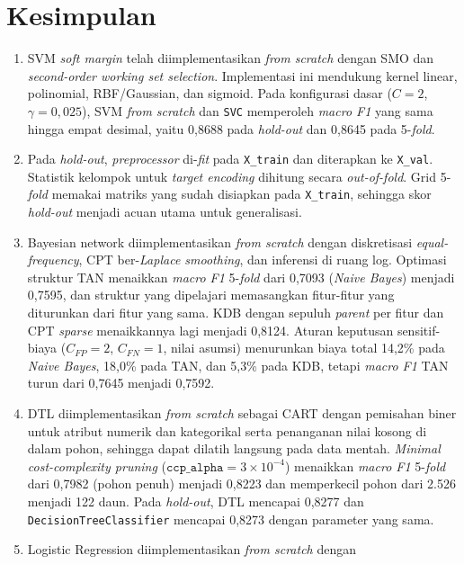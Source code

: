 \section{Kesimpulan}

\begin{enumerate}
	\item SVM \textit{soft margin} telah diimplementasikan \textit{from scratch}
	dengan SMO dan \textit{second-order working set selection}. Implementasi ini
	mendukung kernel linear, polinomial, RBF/Gaussian, dan sigmoid. Pada
	konfigurasi dasar ($C=2$, $\gamma=0{,}025$), SVM \textit{from scratch} dan
	\texttt{SVC} memperoleh \textit{macro F1} yang sama hingga empat desimal,
	yaitu 0,8688 pada \textit{hold-out} dan 0,8645 pada 5-\textit{fold}.
	\item Pada \textit{hold-out}, \textit{preprocessor} di-\textit{fit} pada
	\texttt{X\_train} dan diterapkan ke \texttt{X\_val}. Statistik kelompok
	untuk \textit{target encoding} dihitung secara \textit{out-of-fold}.
	Grid 5-\textit{fold} memakai matriks yang sudah disiapkan pada
	\texttt{X\_train}, sehingga skor \textit{hold-out} menjadi acuan utama
	untuk generalisasi.
\item Bayesian network diimplementasikan \textit{from scratch} dengan
diskretisasi \textit{equal-frequency}, CPT ber-\textit{Laplace smoothing}, dan
inferensi di ruang log. Optimasi struktur TAN menaikkan \textit{macro F1}
5-\textit{fold} dari 0,7093 (\textit{Naive Bayes}) menjadi 0,7595, dan struktur
yang dipelajari memasangkan fitur-fitur yang diturunkan dari fitur yang sama.
KDB dengan sepuluh \textit{parent} per fitur dan CPT \textit{sparse} menaikkannya
lagi menjadi 0,8124.
Aturan keputusan sensitif-biaya ($C_{FP}=2$, $C_{FN}=1$, nilai asumsi) menurunkan
biaya total 14,2\% pada \textit{Naive Bayes}, 18,0\% pada TAN, dan 5,3\% pada
KDB, tetapi \textit{macro F1} TAN turun dari 0,7645 menjadi 0,7592.
	\item DTL diimplementasikan \textit{from scratch} sebagai CART dengan pemisahan
	biner untuk atribut numerik dan kategorikal serta penanganan nilai kosong di
	dalam pohon, sehingga dapat dilatih langsung pada data mentah. \textit{Minimal
	cost-complexity pruning} ($\texttt{ccp\_alpha}=3\times10^{-4}$) menaikkan
	\textit{macro F1} 5-\textit{fold} dari 0,7982 (pohon penuh) menjadi 0,8223 dan
	memperkecil pohon dari 2.526 menjadi 122 daun. Pada \textit{hold-out},
	DTL mencapai 0,8277 dan \texttt{DecisionTreeClassifier} mencapai 0,8273
	dengan parameter yang sama.
	\item Logistic Regression diimplementasikan \textit{from scratch} dengan

\end{enumerate}
